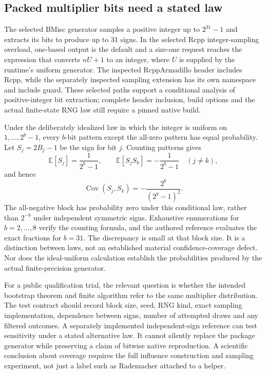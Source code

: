 \subsection{Packed multiplier bits need a stated law}

The selected BMisc generator samples a positive integer up to $2^{31}-1$ and extracts its bits to produce up to 31 signs. In the selected Rcpp integer-sampling overload, one-based output is the default and a size-one request reaches the expression that converts $nU+1$ to an integer, where $U$ is supplied by the runtime's uniform generator. The inspected RcppArmadillo header includes Rcpp, while the separately inspected sampling extension has its own namespace and include guard. These selected paths support a conditional analysis of positive-integer bit extraction; complete header inclusion, build options and the actual finite-state RNG law still require a pinned native build.~\citep{exec29_panel_inference_sources,exec29_panel_runtime_sources}

Under the deliberately idealized law in which the integer is uniform on $1,\ldots,2^b-1$, every $b$-bit pattern except the all-zero pattern has equal probability. Let $S_j=2B_j-1$ be the sign for bit $j$. Counting patterns gives
\[
 \mathbb E[S_j]=\frac{1}{2^b-1},\qquad
 \mathbb E[S_jS_k]=-\frac{1}{2^b-1}\quad(j\ne k),
\]
and hence
\[
 \operatorname{Cov}(S_j,S_k)=-\frac{2^b}{(2^b-1)^2}.
\]
The all-negative block has probability zero under this conditional law, rather than $2^{-b}$ under independent symmetric signs. Exhaustive enumerations for $b=2,\ldots,8$ verify the counting formula, and the authored reference evaluates the exact fractions for $b=31$. The discrepancy is small at that block size. It is a distinction between laws, not an established material confidence-coverage defect. Nor does the ideal-uniform calculation establish the probabilities produced by the actual finite-precision generator.~\citep{exec29_panel_runtime_reference}

For a public qualification trial, the relevant question is whether the intended bootstrap theorem and finite algorithm refer to the same multiplier distribution. The test contract should record block size, seed, RNG kind, exact sampling implementation, dependence between signs, number of attempted draws and any filtered outcomes. A separately implemented independent-sign reference can test sensitivity under a stated alternative law. It cannot silently replace the package generator while preserving a claim of bitwise native reproduction. A scientific conclusion about coverage requires the full influence construction and sampling experiment, not just a label such as Rademacher attached to a helper.~\citep{exec29_panel_runtime_sources,exec29_panel_runtime_reference}

